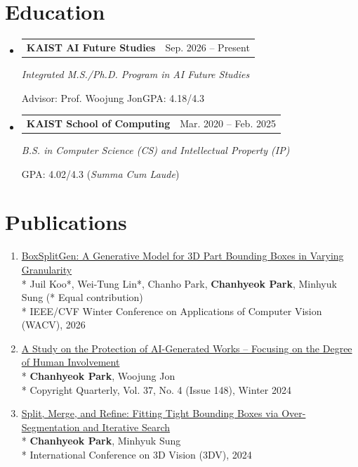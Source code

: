 \documentclass[10pt,a4paper]{article}
\makeatletter
\newenvironment{cvlist}{%
  \begin{itemize}[leftmargin=0pt,label={},itemsep=9pt,
    topsep=0pt,parsep=0pt,partopsep=0pt]%
}{\end{itemize}}
\newcommand{\entryhead}[2]{%
  \Needspace{4\baselineskip}%
  \item\begin{tabularx}{\linewidth}[t]{@{}>{\raggedright\arraybackslash}X@{\hspace{1em}}r@{}}%
    \textbf{#2} & {\small\color{muted}#1}\\
  \end{tabularx}\par\nobreak%
}
\newcommand{\entrytopic}[1]{%
  {\itshape #1\par}\nobreak%
}
\newcommand{\entrymeta}[1]{%
  {\small\color{muted}#1\par}\nobreak\vspace{1pt}%
}
\newcommand{\link}[2]{\href{#1}{#2}}
\makeatother
\begin{document}
\section{Education}
\begin{cvlist}
  \entryhead{Sep. 2026 -- Present}{KAIST AI Future Studies}
  \entrytopic{Integrated M.S./Ph.D. Program in AI Future Studies}
  \entrymeta{Advisor: Prof. Woojung Jon\quad\textperiodcentered\quad GPA: 4.18/4.3}

  \entryhead{Mar. 2020 -- Feb. 2025}{KAIST School of Computing}
  \entrytopic{B.S. in Computer Science (CS) and Intellectual Property (IP)}
  \entrymeta{GPA: 4.02/4.3 (\textit{Summa Cum Laude})}
\end{cvlist}

\section{Publications}
\begin{enumerate}
  \item \link{https://arxiv.org/abs/2602.20666}{BoxSplitGen: A Generative Model for 3D Part Bounding Boxes in Varying Granularity}\\*
  Juil Koo*, Wei-Tung Lin*, Chanho Park, \textbf{Chanhyeok Park}, Minhyuk Sung (* Equal contribution)\\*
  IEEE/CVF Winter Conference on Applications of Computer Vision (WACV), 2026

  \item \link{https://www.kci.go.kr/kciportal/ci/sereArticleSearch/ciSereArtiView.kci?sereArticleSearchBean.artiId=ART003158926}{A Study on the Protection of AI-Generated Works -- Focusing on the Degree of Human Involvement}\\*
  \textbf{Chanhyeok Park}, Woojung Jon\\*
  Copyright Quarterly, Vol. 37, No. 4 (Issue 148), Winter 2024

  \item \link{https://arxiv.org/abs/2304.04336}{Split, Merge, and Refine: Fitting Tight Bounding Boxes via Over-Segmentation and Iterative Search}\\*
  \textbf{Chanhyeok Park}, Minhyuk Sung\\*
  International Conference on 3D Vision (3DV), 2024
\end{enumerate}

\clearpage
\end{document}
